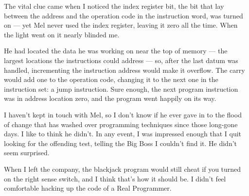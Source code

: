 \documentclass[12pt]{article}
\begin{document}
\bigskip
\noindent
The vital clue came when I noticed
the index register bit,
the bit that lay between the address
and the operation code in the instruction word,
was turned on ---
yet Mel never used the index register,
leaving it zero all the time.
When the light went on it nearly blinded me.

\bigskip
\noindent
He had located the data he was working on
near the top of memory ---
the largest locations the instructions could address ---
so, after the last datum was handled,
incrementing the instruction address
would make it overflow.
The carry would add one to the
operation code, changing it to the next one in the instruction set:
a jump instruction.
Sure enough, the next program instruction was
in address location zero,
and the program went happily on its way.

\bigskip
\noindent
I haven't kept in touch with Mel,
so I don't know if he ever gave in to the flood of
change that has washed over programming techniques
since those long-gone days.
I like to think he didn't.
In any event,
I was impressed enough that I quit looking for the
offending test,
telling the Big Boss I couldn't find it.
He didn't seem surprised.

\bigskip
\noindent
When I left the company,
the blackjack program would still cheat
if you turned on the right sense switch,
and I think that's how it should be.
I didn't feel comfortable
hacking up the code of a Real Programmer.
\end{document}
